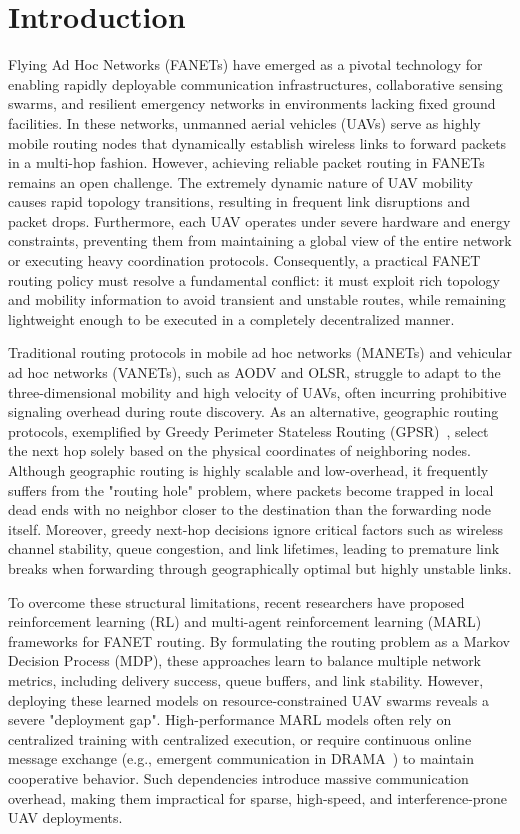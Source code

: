 \section{Introduction}
\label{sec:introduction}

Flying Ad Hoc Networks (FANETs) have emerged as a pivotal technology for enabling rapidly deployable communication infrastructures, collaborative sensing swarms, and resilient emergency networks in environments lacking fixed ground facilities. In these networks, unmanned aerial vehicles (UAVs) serve as highly mobile routing nodes that dynamically establish wireless links to forward packets in a multi-hop fashion. However, achieving reliable packet routing in FANETs remains an open challenge. The extremely dynamic nature of UAV mobility causes rapid topology transitions, resulting in frequent link disruptions and packet drops. Furthermore, each UAV operates under severe hardware and energy constraints, preventing them from maintaining a global view of the entire network or executing heavy coordination protocols. Consequently, a practical FANET routing policy must resolve a fundamental conflict: it must exploit rich topology and mobility information to avoid transient and unstable routes, while remaining lightweight enough to be executed in a completely decentralized manner.

Traditional routing protocols in mobile ad hoc networks (MANETs) and vehicular ad hoc networks (VANETs), such as AODV and OLSR, struggle to adapt to the three-dimensional mobility and high velocity of UAVs, often incurring prohibitive signaling overhead during route discovery. As an alternative, geographic routing protocols, exemplified by Greedy Perimeter Stateless Routing (GPSR)~\cite{gpsr}, select the next hop solely based on the physical coordinates of neighboring nodes. Although geographic routing is highly scalable and low-overhead, it frequently suffers from the "routing hole" problem, where packets become trapped in local dead ends with no neighbor closer to the destination than the forwarding node itself. Moreover, greedy next-hop decisions ignore critical factors such as wireless channel stability, queue congestion, and link lifetimes, leading to premature link breaks when forwarding through geographically optimal but highly unstable links.

To overcome these structural limitations, recent researchers have proposed reinforcement learning (RL) and multi-agent reinforcement learning (MARL) frameworks for FANET routing. By formulating the routing problem as a Markov Decision Process (MDP), these approaches learn to balance multiple network metrics, including delivery success, queue buffers, and link stability. However, deploying these learned models on resource-constrained UAV swarms reveals a severe "deployment gap". High-performance MARL models often rely on centralized training with centralized execution, or require continuous online message exchange (e.g., emergent communication in DRAMA~\cite{drama}) to maintain cooperative behavior. Such dependencies introduce massive communication overhead, making them impractical for sparse, high-speed, and interference-prone UAV deployments. 

